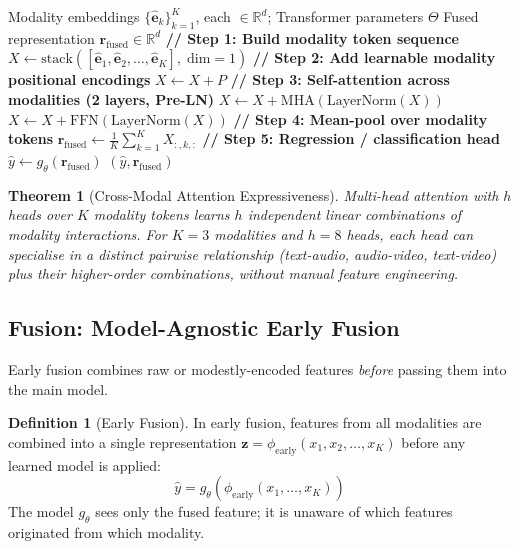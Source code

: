 \documentclass[12pt,a4paper]{article}
\theoremstyle{definition}
\newtheorem{definition}{Definition}[section]
\theoremstyle{plain}
\newtheorem{theorem}{Theorem}[section]
\theoremstyle{remark}
\newcommand{\R}{\mathbb{R}}
\newcommand{\LN}{\mathrm{LayerNorm}}
\newcommand{\MHA}{\mathrm{MHA}}
\begin{document}
\begin{algorithm}[H]
\caption{Model-Based Multimodal Fusion (Cross-Modal Transformer)}
\label{alg:model_based_fusion}
\begin{algorithmic}[1]
\Require Modality embeddings $\{\hat{\mathbf{e}}_k\}_{k=1}^K$, each $\in \R^d$; Transformer parameters $\Theta$
\Ensure Fused representation $\mathbf{r}_{\text{fused}} \in \R^d$
\State \textbf{// Step 1: Build modality token sequence}
\State $X \gets \text{stack}([\hat{\mathbf{e}}_1, \hat{\mathbf{e}}_2, \ldots, \hat{\mathbf{e}}_K],\; \text{dim}=1)$ \Comment{$[B, K, d]$}
\State \textbf{// Step 2: Add learnable modality positional encodings}
\State $X \gets X + P$ \Comment{$P \in \R^{K \times d}$ learned modality tags}
\State \textbf{// Step 3: Self-attention across modalities (2 layers, Pre-LN)}
  \State $X \gets X + \MHA(\LN(X))$ 
  \State $X \gets X + \text{FFN}(\LN(X))$ 
\EndFor
\State \textbf{// Step 4: Mean-pool over modality tokens}
\State $\mathbf{r}_{\text{fused}} \gets \frac{1}{K}\sum_{k=1}^K X_{:,k,:}$ \Comment{$[B, d]$}
\State \textbf{// Step 5: Regression / classification head}
\State $\hat{y} \gets g_\theta(\mathbf{r}_{\text{fused}})$
\State \Return $(\hat{y}, \mathbf{r}_{\text{fused}})$
\end{algorithmic}
\end{algorithm}

\begin{theorem}[Cross-Modal Attention Expressiveness]
Multi-head attention with $h$ heads over $K$ modality tokens learns $h$ independent linear combinations of modality interactions. For $K=3$ modalities and $h=8$ heads, each head can specialise in a distinct pairwise relationship (text-audio, audio-video, text-video) plus their higher-order combinations, without manual feature engineering.
\end{theorem}

\subsection{Fusion: Model-Agnostic Early Fusion}

Early fusion combines raw or modestly-encoded features \emph{before} passing them into the main model.

\begin{definition}[Early Fusion]
In early fusion, features from all modalities are combined into a single representation $\mathbf{z} = \phi_{\text{early}}(x_1, x_2, \ldots, x_K)$ before any learned model is applied:
\[
  \hat{y} = g_\theta(\phi_{\text{early}}(x_1, \ldots, x_K))
\]
The model $g_\theta$ sees only the fused feature; it is unaware of which features originated from which modality.
\end{definition}
\end{document}
